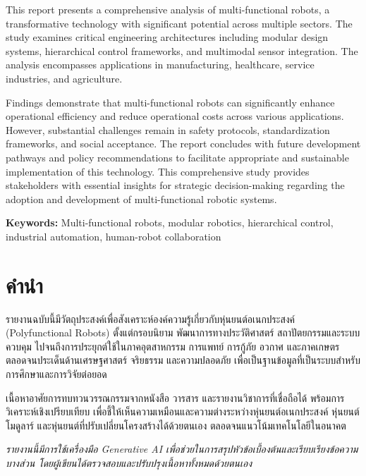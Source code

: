 \documentclass[a4paper]{article}
\begin{document}
\begin{justify}
This report presents a comprehensive analysis of multi-functional robots, a transformative technology with significant potential across multiple sectors. The study examines critical engineering architectures including modular design systems, hierarchical control frameworks, and multimodal sensor integration. The analysis encompasses applications in manufacturing, healthcare, service industries, and agriculture. 

Findings demonstrate that multi-functional robots can significantly enhance operational efficiency and reduce operational costs across various applications. However, substantial challenges remain in safety protocols, standardization frameworks, and social acceptance. The report concludes with future development pathways and policy recommendations to facilitate appropriate and sustainable implementation of this technology. This comprehensive study provides stakeholders with essential insights for strategic decision-making regarding the adoption and development of multi-functional robotic systems.
\end{justify}

\vspace{1em}

\noindent
\textbf{Keywords:} Multi-functional robots, modular robotics, hierarchical control, industrial automation, human-robot collaboration

\newpage

\tableofcontents
\newpage

\setcounter{page}{1}

\section*{คำนำ}

\begin{justify}
รายงานฉบับนี้มีวัตถุประสงค์เพื่อสังเคราะห์องค์ความรู้เกี่ยวกับหุ่นยนต์อเนกประสงค์ (Polyfunctional Robots) ตั้งแต่กรอบนิยาม พัฒนาการทางประวัติศาสตร์ สถาปัตยกรรมและระบบควบคุม ไปจนถึงการประยุกต์ใช้ในภาคอุตสาหกรรม การแพทย์ การกู้ภัย อวกาศ และภาคเกษตร ตลอดจนประเด็นด้านเศรษฐศาสตร์ จริยธรรม และความปลอดภัย เพื่อเป็นฐานข้อมูลที่เป็นระบบสำหรับการศึกษาและการวิจัยต่อยอด

เนื้อหาอาศัยการทบทวนวรรณกรรมจากหนังสือ วารสาร และรายงานวิชาการที่เชื่อถือได้ พร้อมการวิเคราะห์เชิงเปรียบเทียบ เพื่อชี้ให้เห็นความเหมือนและความต่างระหว่างหุ่นยนต์อเนกประสงค์ หุ่นยนต์โมดูลาร์ และหุ่นยนต์ที่ปรับเปลี่ยนโครงสร้างได้ด้วยตนเอง ตลอดจนแนวโน้มเทคโนโลยีในอนาคต

{\itshape รายงานนี้มีการใช้เครื่องมือ Generative AI เพื่อช่วยในการสรุปหัวข้อเบื้องต้นและเรียบเรียงข้อความบางส่วน โดยผู้เขียนได้ตรวจสอบและปรับปรุงเนื้อหาทั้งหมดด้วยตนเอง}
\end{justify}
\end{document}
